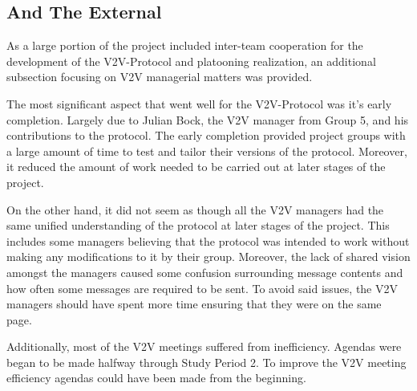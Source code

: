 \documentclass[12pt]{article}
\begin{document}
\subsection{And The External}
As a large portion of the project included inter-team cooperation for the development of the V2V-Protocol and platooning realization, an additional subsection focusing on V2V managerial matters was provided. \par
The most significant aspect that went well for the V2V-Protocol was it's early completion. Largely due to Julian Bock, the V2V manager from Group 5, and his contributions to the protocol. The early completion provided project groups with a large amount of time to test and tailor their versions of the protocol. Moreover, it reduced the amount of work needed to be carried out at later stages of the project. \par
On the other hand, it did not seem as though all the V2V managers had the same unified understanding of the protocol at later stages of the project. This includes some managers believing that the protocol was intended to work without making any modifications to it by their group. Moreover, the lack of shared vision amongst the managers caused some confusion surrounding message contents and how often some messages are required to be sent. To avoid said issues, the V2V managers should have spent more time ensuring that they were on the same page. \par 
Additionally, most of the V2V meetings suffered from inefficiency. Agendas were began to be made halfway through Study Period 2. To improve the V2V meeting efficiency agendas could have been made from the beginning.  \par
\pagebreak
\end{document}
